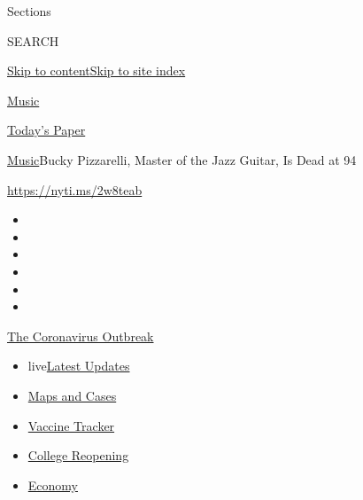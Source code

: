 Sections

SEARCH

\protect\hyperlink{site-content}{Skip to
content}\protect\hyperlink{site-index}{Skip to site index}

\href{https://www.nytimes.com/section/arts/music}{Music}

\href{https://myaccount.nytimes.com/auth/login?response_type=cookie\&client_id=vi}{}

\href{https://www.nytimes.com/section/todayspaper}{Today's Paper}

\href{/section/arts/music}{Music}\textbar{}Bucky Pizzarelli, Master of
the Jazz Guitar, Is Dead at 94

\url{https://nyti.ms/2w8teab}

\begin{itemize}
\item
\item
\item
\item
\item
\item
\end{itemize}

\href{https://www.nytimes.com/news-event/coronavirus?action=click\&pgtype=Article\&state=default\&region=TOP_BANNER\&context=storylines_menu}{The
Coronavirus Outbreak}

\begin{itemize}
\tightlist
\item
  live\href{https://www.nytimes.com/2020/08/03/world/coronavirus-covid-19.html?action=click\&pgtype=Article\&state=default\&region=TOP_BANNER\&context=storylines_menu}{Latest
  Updates}
\item
  \href{https://www.nytimes.com/interactive/2020/us/coronavirus-us-cases.html?action=click\&pgtype=Article\&state=default\&region=TOP_BANNER\&context=storylines_menu}{Maps
  and Cases}
\item
  \href{https://www.nytimes.com/interactive/2020/science/coronavirus-vaccine-tracker.html?action=click\&pgtype=Article\&state=default\&region=TOP_BANNER\&context=storylines_menu}{Vaccine
  Tracker}
\item
  \href{https://www.nytimes.com/2020/08/02/us/covid-college-reopening.html?action=click\&pgtype=Article\&state=default\&region=TOP_BANNER\&context=storylines_menu}{College
  Reopening}
\item
  \href{https://www.nytimes.com/live/2020/08/03/business/stock-market-today-coronavirus?action=click\&pgtype=Article\&state=default\&region=TOP_BANNER\&context=storylines_menu}{Economy}
\end{itemize}

